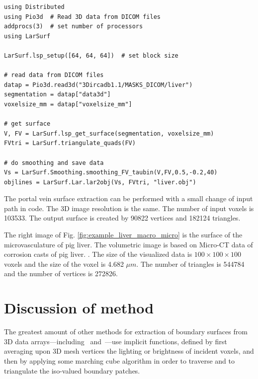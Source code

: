 \begin{lstlisting}[caption={Get surface from DICOM volumetric data}, label={lst:example1}, basicstyle=\small]
using Distributed
using Pio3d  # Read 3D data from DICOM files
addprocs(3)  # set number of processors
using LarSurf

LarSurf.lsp_setup([64, 64, 64])  # set block size

# read data from DICOM files
datap = Pio3d.read3d("3Dircadb1.1/MASKS_DICOM/liver")
segmentation = datap["data3d"]
voxelsize_mm = datap["voxelsize_mm"]

# get surface
V, FV = LarSurf.lsp_get_surface(segmentation, voxelsize_mm)
FVtri = LarSurf.triangulate_quads(FV)

# do smoothing and save data
Vs = LarSurf.Smoothing.smoothing_FV_taubin(V,FV,0.5,-0.2,40)
objlines = LarSurf.Lar.lar2obj(Vs, FVtri, "liver.obj")
\end{lstlisting}

The portal vein surface extraction can be performed with a small change of input path in code.
The 3D image resolution is the same. 
The number of input voxels is 103533. 
The output surface is created by 90822 vertices and 182124 triangles. 

The right image of Fig. \ref{fig:example_liver_macro_micro} is the surface of the microvasculature of pig liver. 
The volumetric image is based on Micro-CT data of corrosion casts of pig liver.
\cite{eberlova2017use}.
The size of the visualized data is $100\times100\times100$ voxels and the size of the voxel is 4.682 $\mu{}m$.
The number of triangles is 
544784 and the number of vertices is 272826.





\section{Discussion of method}\label{sec:discussion}

The greatest amount of other methods for extraction of boundary surfaces from 3D data arrays---including~\cite{10.1016/j.cad.2006.09.003} and~\cite{10.1115/1.2960489}---use implicit functions, defined by first averaging upon 3D mesh vertices the lighting or brightness of incident voxels, and then by applying some marching cube algorithm in order to traverse and to triangulate  the iso-valued boundary patches.  

